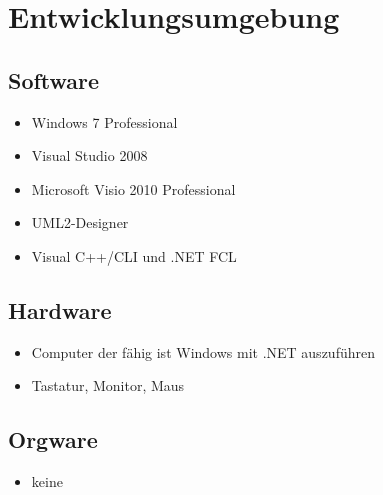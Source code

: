 
\section{Entwicklungsumgebung}



\subsection{Software}

\begin{itemize}
	\item Windows 7 Professional
	\item Visual Studio 2008
	\item Microsoft Visio 2010 Professional
	\item UML2-Designer
	\item Visual C++/CLI und .NET FCL
\end{itemize}

\subsection{Hardware}

\begin{itemize}
	\item Computer der fähig ist Windows mit .NET auszuführen
	\item Tastatur, Monitor, Maus
\end{itemize}

\subsection{Orgware}

\begin{itemize}
	\item keine
\end{itemize}
